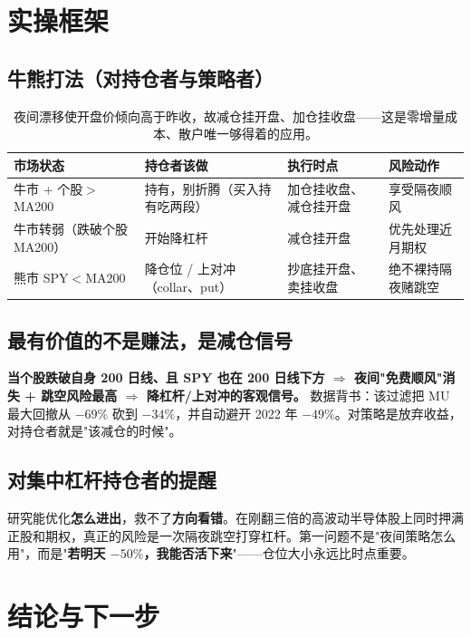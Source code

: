 \documentclass[11pt,a4paper,fontset=none]{ctexart}
\newcommand{\negv}[1]{\textcolor{bad}{#1}}
\begin{document}
\section{实操框架}
\subsection{牛熊打法（对持仓者与策略者）}
\begin{table}[H]\centering\small
\begin{tabular}{p{3.4cm}p{4.6cm}p{3.4cm}p{2.8cm}}
\toprule
市场状态 & 持仓者该做 & 执行时点 & 风险动作 \\
\midrule
牛市 + 个股$>$MA200 & 持有，别折腾（买入持有吃两段） & 加仓挂收盘、减仓挂开盘 & 享受隔夜顺风 \\
牛市转弱（跌破个股 MA200） & 开始降杠杆 & 减仓挂开盘 & 优先处理近月期权 \\
熊市 SPY$<$MA200 & 降仓位 / 上对冲（collar、put） & 抄底挂开盘、卖挂收盘 & \negv{绝不裸持隔夜赌跳空} \\
\bottomrule
\end{tabular}
\caption{夜间漂移使开盘价倾向高于昨收，故减仓挂开盘、加仓挂收盘——这是零增量成本、散户唯一够得着的应用。}\end{table}

\subsection{最有价值的不是赚法，是减仓信号}
\textbf{当个股跌破自身 200 日线、且 SPY 也在 200 日线下方 $\Rightarrow$ 夜间"免费顺风"消失 + 跳空风险最高 $\Rightarrow$ 降杠杆/上对冲的客观信号。} 数据背书：该过滤把 MU 最大回撤从 $-69\%$ 砍到 $-34\%$，并自动避开 2022 年 $-49\%$。对策略是放弃收益，对持仓者就是"该减仓的时候"。

\subsection{对集中杠杆持仓者的提醒}
研究能优化\textbf{怎么进出}，救不了\textbf{方向看错}。在刚翻三倍的高波动半导体股上同时押满正股和期权，真正的风险是一次隔夜跳空打穿杠杆。第一问题不是"夜间策略怎么用"，而是"\textbf{若明天 $-50\%$，我能否活下来}"——仓位大小永远比时点重要。

\section{结论与下一步}
\end{document}
